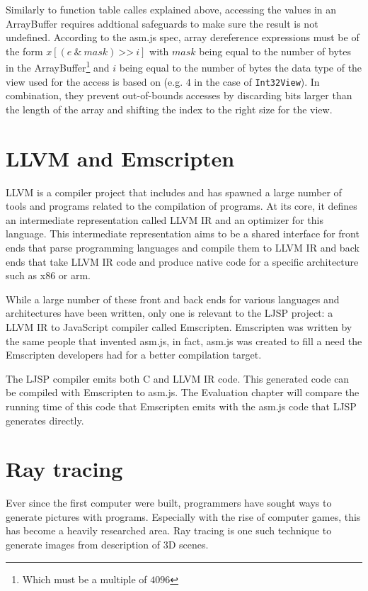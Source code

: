 \documentclass[11pt]{report}
\begin{document}
Similarly to function table calles explained above, accessing the values in an ArrayBuffer requires addtional safeguards to make sure the result is not undefined. According to the asm.js spec, array dereference expressions must be of the form $x[(e~\text{\&}~mask)~\text{>}\text{>}~i]$ with $mask$ being equal to the number of bytes in the ArrayBuffer\footnote{Which must be a multiple of $4096$} and $i$ being equal to the number of bytes the data type of the view used for the access is based on (e.g. $4$ in the case of \texttt{Int32View}). In combination, they prevent out-of-bounds accesses by discarding bits larger than the length of the array and shifting the index to the right size for the view.

\section{LLVM and Emscripten}
LLVM is a compiler project that includes and has spawned a large number of tools and programs related to the compilation of programs. At its core, it defines an intermediate representation called LLVM IR and an optimizer for this language. This intermediate representation aims to be a shared interface for front ends that parse programming languages and compile them to LLVM IR and back ends that take LLVM IR code and produce native code for a specific architecture such as x86 or arm. 

While a large number of these front and back ends for various languages and architectures have been written, only one is relevant to the LJSP project: a LLVM IR to JavaScript compiler called Emscripten. Emscripten was written by the same people that invented asm.js, in fact, asm.js was created to fill a need the Emscripten developers had for a better compilation target.

The LJSP compiler emits both C and LLVM IR code. This generated code can be compiled with Emscripten to asm.js. The Evaluation chapter will compare the running time of this code that Emscripten emits with the asm.js code that LJSP generates directly.

\section{Ray tracing}
Ever since the first computer were built, programmers have sought ways to generate pictures with programs. Especially with the rise of computer games, this has become a heavily researched area. Ray tracing is one such technique to generate images from description of 3D scenes.
\end{document}
